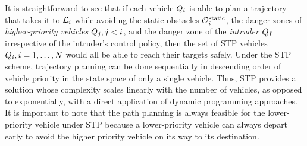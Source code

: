 It is straightforward to see that if each vehicle $Q_i$ is able to plan a trajectory that takes it to $\mathcal{L}_i$ while avoiding the static obstacles $\mathcal{O}^\text{static}_i$, the danger zones of \textit{higher-priority vehicles} $Q_j, j<i$, and the danger zone of the \textit{intruder} $Q_{I}$ irrespective of the intruder's control policy, then the set of STP vehicles $Q_i, i=1,\ldots,N$ would all be able to reach their targets safely. Under the STP scheme, trajectory planning can be done sequentially in descending order of vehicle priority in the state space of only a single vehicle. Thus, STP provides a solution whose complexity scales linearly with the number of vehicles, as opposed to exponentially, with a direct application of dynamic programming approaches. It is important to note that the path planning is always feasible for the lower-priority vehicle under STP because a lower-priority vehicle can always depart early to avoid the higher priority vehicle on its way to its destination.

